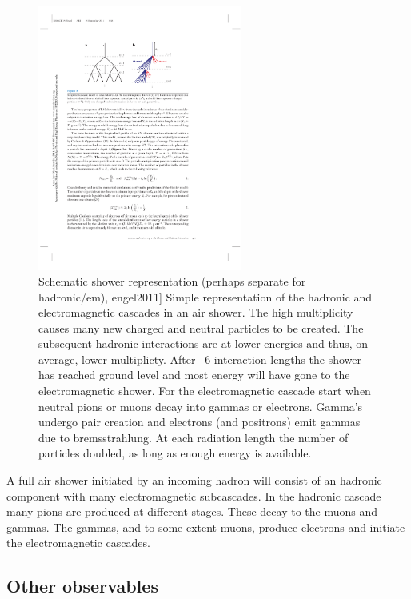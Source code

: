 \begin{figure}
    \centering
    \includegraphics[width=0.6\textwidth]
                    {plots/cosmic-rays/schematic_shower}
    \caption{Schematic shower representation (perhaps separate for hadronic/em), engel2011]
Simple representation of the hadronic and electromagnetic cascades in an air shower. The high multiplicity causes many new charged and neutral particles to be created. The subsequent hadronic interactions are at lower energies and thus, on average, lower multiplicty. After ~6 interaction lengths the shower has reached ground level and most energy will have gone to the electromagnetic shower. For the electromagnetic cascade start when neutral pions or muons decay into gammas or electrons. Gamma's undergo pair creation and electrons (and positrons) emit gammas due to bremsstrahlung. At each radiation length the number of particles doubled, as long as enough energy is available.}
    \label{fig:schematic_shower}
\end{figure}

A full air shower initiated by an incoming hadron will consist of an hadronic component with many electromagnetic subcascades. In the hadronic cascade many pions are produced at different stages. These decay to the muons and gammas. The gammas, and to some extent muons, produce electrons and initiate the electromagnetic cascades.

\subsection{Other observables}

